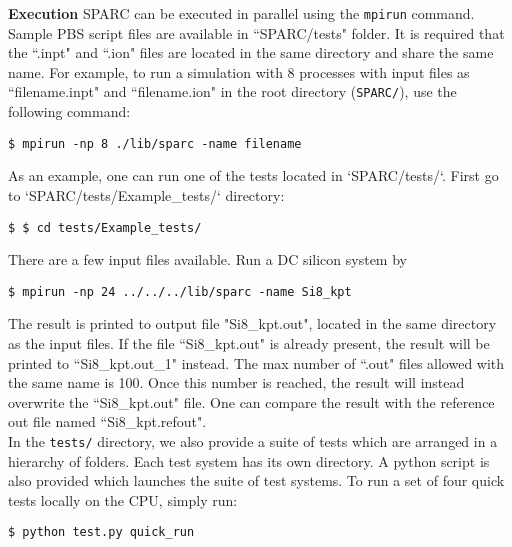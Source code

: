 \begin{frame}{\textbf{Execution}} \label{Execution}
SPARC can be executed in parallel using the \texttt{mpirun} command. Sample PBS script files are available in ``SPARC/tests" folder. It is required that the ``.inpt" and ``.ion" files are located in the same directory and share the same name. For example, to run a simulation with 8 processes with input files as ``filename.inpt" and ``filename.ion" in the root directory (\texttt{SPARC/}), use the following command:
\begin{verbatim}
$ mpirun -np 8 ./lib/sparc -name filename
\end{verbatim} 
As an example, one can run one of the tests located in `SPARC/tests/`. First go to `SPARC/tests/Example\_tests/` directory:
\begin{verbatim}
$ $ cd tests/Example_tests/
\end{verbatim} 
There are a few input files available. Run a DC silicon system by
\begin{verbatim}
$ mpirun -np 24 ../../../lib/sparc -name Si8_kpt
\end{verbatim} 

The result is printed to output file "Si8_kpt.out", located in the same directory as the input files. If the file ``Si8_kpt.out" is already present, the result will be printed to ``Si8_kpt.out\_1" instead. The max number of ``.out" files allowed with the same name is 100. Once this number is reached, the result will instead overwrite the ``Si8_kpt.out" file. One can compare the result with the reference out file named ``Si8_kpt.refout".\\%


\hspace{3mm} In the \texttt{tests/} directory, we also provide a suite of tests which are arranged in a hierarchy of folders. Each test system has its own directory. A python script is also provided which launches the suite of test systems. To run a set of four quick tests locally on the CPU, simply run: 
\begin{verbatim}
$ python test.py quick_run
\end{verbatim} 


\end{frame}
